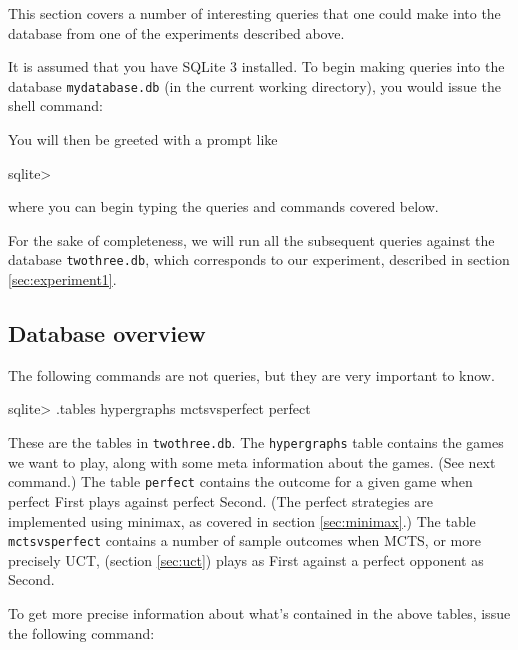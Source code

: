 This section covers a number of interesting queries that one could make into the database from one of the experiments described above.

It is assumed that you have SQLite 3 installed.
To begin making queries into the database \texttt{mydatabase.db} (in the current working directory), you would issue the shell command:
You will then be greeted with a prompt like
\begin{code}
sqlite> 
\end{code}
where you can begin typing the queries and commands covered below.

For the sake of completeness, we will run all the subsequent queries against the database \texttt{twothree.db}, which corresponds to our experiment, described in section \ref{sec:experiment1}.

\subsection{Database overview}

The following commands are not queries, but they are very important to know.
\begin{code}
sqlite> .tables
hypergraphs    mctsvsperfect  perfect 
\end{code}
These are the tables in \texttt{twothree.db}. The \texttt{hypergraphs} table contains the games we want to play, along with some meta information about the games. (See next command.)
The table \texttt{perfect} contains the outcome for a given game when perfect First plays against perfect Second. (The perfect strategies are implemented using minimax, as covered in section \ref{sec:minimax}.)
The table \texttt{mctsvsperfect} contains a number of sample outcomes when MCTS, or more precisely UCT, (section \ref{sec:uct}) plays as First against a perfect opponent as Second.

To get more precise information about what's contained in the above tables, issue the following command:

